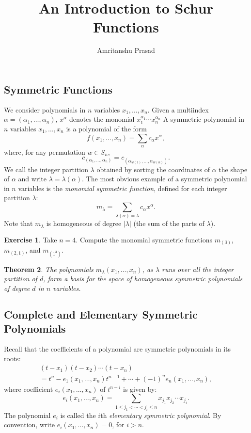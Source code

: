 \documentclass[11pt]{amsart}
\title{An Introduction to Schur Functions}
\author{Amritanshu Prasad}
\newtheorem{theorem}{Theorem}[subsection]
\theoremstyle{definition}
\theoremstyle{example}
\newtheorem{exercise}[theorem]{Exercise}
\begin{document}
\maketitle
\renewcommand{\thesubsection}{\arabic{subsection}}
\subsection{Symmetric Functions}
\label{sec:symmetric-functions}
We consider polynomials in $n$ variables $x_1,\dotsc,x_n$.
Given a multiindex $\alpha=(\alpha_1,\dotsc, \alpha_n)$, $x^\alpha$ denotes the monomial $x_1^{\alpha_1}\dotsb x_n^{\alpha_n}$
A symmetric polynomial in $n$ variables $x_1,\dotsc, x_n$ is a polynomial of the form
\begin{displaymath}
  f(x_1,\dotsc, x_n) = \sum_{\alpha} c_\alpha x^\alpha,
\end{displaymath}
where, for any permutation $w\in S_n$,
\begin{displaymath}
  c_{(\alpha_1,\dotsc,\alpha_n)} = c_{(\alpha_{w(1)},\dotsc,\alpha_{w(n)})}.
\end{displaymath}
We call the integer partition $\lambda$ obtained by sorting the coordinates of $\alpha$ the shape of $\alpha$ and write $\lambda = \lambda(\alpha)$.
The most obvious example of a symmetric polynomial in $n$ variables is the \emph{monomial symmetric function}, defined for each integer partition $\lambda$:
\begin{displaymath}
  m_\lambda = \sum_{\lambda(\alpha) = \lambda} c_\alpha x^\alpha.
\end{displaymath}
Note that $m_\lambda$ is homogeneous of degree $|\lambda|$ (the sum of the parts of $\lambda$).
\begin{exercise}
  Take $n=4$. Compute the monomial symmetric functions $m_{(3)}$, $m_{(2,1)}$, and $m_{(1^3)}$.
\end{exercise}
\begin{theorem}
The polynomials $m_\lambda(x_1,\dotsc,x_n)$, as $\lambda$ runs over all the integer partition of $d$, form a basis for the space of homogeneous symmetric polynomials of degree $d$ in $n$ variables.
\end{theorem}
\subsection{Complete and Elementary Symmetric Polynomials}
\label{sec:compl-elem-symm}
Recall that the coefficients of a polynomial are symmetric polynomials in its roots:
\begin{multline}
  \label{eq:elem-id}
  (t-x_1)(t-x_2)\dotsb (t-x_n) \\= t^n - e_1(x_1,\dotsc, x_n)t^{n-1} + \dotsb + (-1)^n e_n(x_1,\dotsc, x_n),
\end{multline}
where coefficient $e_i(x_1,\dotsc, x_n)$ of $t^{n-i}$ is given by:
\begin{equation}
  \label{eq:elem}
  e_i(x_1,\dotsc, x_n) = \sum_{1\leq j_1<\dotsb<j_i\leq n} x_{j_1}x_{j_2}\dotsb x_{j_i}.
\end{equation}
The polynomial $e_i$ is called the $i$th \emph{elementary symmetric polynomial}.
By convention, write $e_i(x_1,\dotsc,x_n)=0$, for $i>n$.
\end{document}

